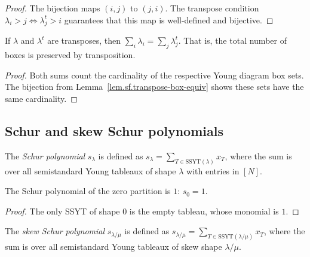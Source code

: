 \begin{proof}
\leanok
The bijection maps $(i, j)$ to $(j, i)$.
The transpose condition $\lambda_i > j \iff \lambda^t_j > i$ guarantees
that this map is well-defined and bijective.
\end{proof}

\begin{lemma}
\label{lem.sf.transpose-sum-eq}
\leanhelper
\leanok
If $\lambda$ and $\lambda^t$ are transposes, then
$\sum_i \lambda_i = \sum_j \lambda^t_j$.
That is, the total number of boxes is preserved by transposition.
\end{lemma}

\begin{proof}
\leanok
Both sums count the cardinality of the respective Young diagram box sets.
The bijection from Lemma~\ref{lem.sf.transpose-box-equiv} shows these
sets have the same cardinality.
\end{proof}

\subsection{Schur and skew Schur polynomials}

\begin{definition}
\label{def.sf.schur-local}
\leanhelper
\leanok
The \emph{Schur polynomial} $s_\lambda$ is defined as
$s_\lambda = \sum_{T \in \mathrm{SSYT}(\lambda)} x_T$,
where the sum is over all semistandard Young tableaux of shape $\lambda$
with entries in $[N]$.
\end{definition}

\begin{lemma}
\label{lem.sf.schur-zero}
\leanhelper
\leanok
The Schur polynomial of the zero partition is $1$:
$s_0 = 1$.
\end{lemma}

\begin{proof}
\leanok
The only SSYT of shape $0$ is the empty tableau, whose monomial is $1$.
\end{proof}

\begin{definition}
\label{def.sf.skew-schur-local}
\leanhelper
\leanok
The \emph{skew Schur polynomial} $s_{\lambda/\mu}$ is defined as
$s_{\lambda/\mu} = \sum_{T \in \mathrm{SSYT}(\lambda/\mu)} x_T$,
where the sum is over all semistandard Young tableaux of skew shape $\lambda/\mu$.
\end{definition}

